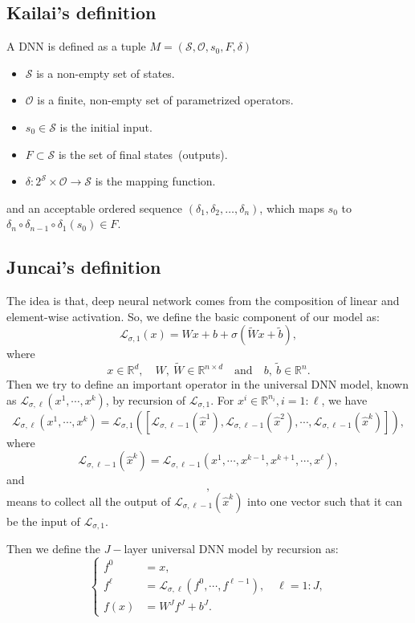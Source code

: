 \subsection{Kailai's definition}
A DNN is defined as a tuple $M=(\mathcal{S}, \mathcal{O}, s_0, F, \delta)$
\begin{itemize}
	\item $\mathcal{S}$ is a non-empty set of states.
	\item $\mathcal{O}$ is a finite, non-empty set of parametrized operators.
	\item $s_0\in \mathcal{S}$ is the initial input. 
	\item $F\subset \mathcal{S}$ is the set of final states~(outputs). 
	\item $\delta: 2^{\mathcal{S}}\times \mathcal{O} \rightarrow \mathcal{S}$ is the mapping function. 
\end{itemize}
and an acceptable ordered sequence $(\delta_1, \delta_2, \ldots, \delta_n)$, which maps $s_0$ to $\delta_n \circ \delta_{n-1} \circ \delta_1 (s_0) \in F$.

\subsection{Juncai's definition}
The idea is that, deep neural network comes from the composition of linear and 
element-wise activation. 
So, we define the basic component of our model as:
\begin{equation}
\mathcal L_{\sigma,1}(x) = Wx + b + \sigma(\tilde Wx + \tilde b),
\end{equation}
where 
\begin{equation}
x \in \mathbb{R}^d, \quad W, ~ \tilde W \in \mathbb{R}^{n \times d} \quad \text{and} \quad b,~ \tilde b \in \mathbb{R}^n.
\end{equation}
Then we try to define an important operator in the universal DNN model,
known as $\mathcal L_{\sigma, \ell}(x^1, \cdots, x^k)$, by recursion of $\mathcal L_{\sigma,1}$. 
For $x^i \in \mathbb{R}^{n_i}, i = 1:\ell$,  we have
\begin{equation}
\mathcal L_{\sigma, \ell}(x^1, \cdots, x^k) = \mathcal L_{\sigma,1}
\left([\mathcal L_{\sigma, \ell-1}(\hat x^1), \mathcal L_{\sigma, \ell-1}(\hat x^2), \cdots, \mathcal L_{\sigma, \ell-1}(\hat x^k)]\right),
\end{equation}
where
\begin{equation}
\mathcal L_{\sigma, \ell-1}(\hat x^k) = \mathcal L_{\sigma, \ell-1} (x^1, \cdots, x^{k-1}, x^{k+1}, \cdots, x^\ell),
\end{equation}
and 
\begin{equation}
[\mathcal L_{\sigma, \ell-1}(\hat x^1), \mathcal L_{\sigma, \ell-1}(\hat x^2), \cdots, \mathcal L_{\sigma, \ell-1}(\hat x^k)],
\end{equation}
means to collect all the output of $\mathcal L_{\sigma, \ell-1}(\hat x^k)$ into one vector such 
that it can be the input of $\mathcal L_{\sigma, 1}$.

Then we define the $J-$layer universal DNN model by recursion as:
\begin{equation}
\begin{cases}
f^{0} &= x,  \\
f^{\ell} &= \mathcal L_{\sigma, \ell}(f^0,\cdots, f^{\ell-1}), \quad \ell = 1:J, \\
f(x) &= W^J f^J + b^J. 
\end{cases}
\end{equation}


